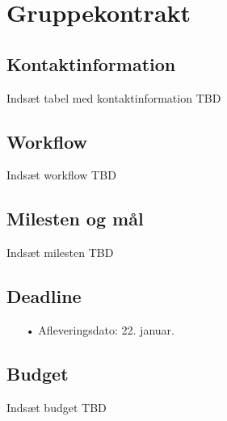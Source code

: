 \section{Gruppekontrakt}
\subsection{Kontaktinformation}
Indsæt tabel med kontaktinformation TBD

\subsection{Workflow}
Indsæt workflow TBD

\subsection{Milesten og mål}
Indsæt milesten TBD

\subsection{Deadline}
\begin{enumerate}
	\item[•]Afleveringsdato: 22. januar.
\end{enumerate}

\subsection{Budget}
Indsæt budget TBD